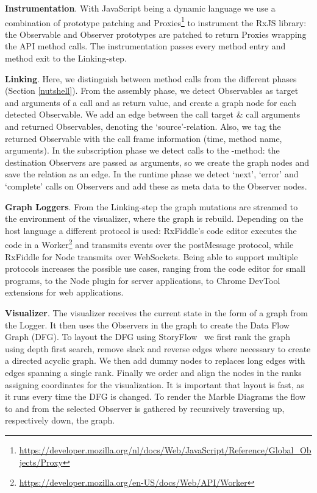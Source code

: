 \textbf{Instrumentation}. With JavaScript being a dynamic language we use a combination of prototype patching and Proxies\footnote{\url{https://developer.mozilla.org/nl/docs/Web/JavaScript/Reference/Global_Objects/Proxy}} to instrument the RxJS library: the Observable and Observer prototypes are patched to return Proxies wrapping the API method calls. The instrumentation passes every method entry and method exit to the Linking-step.

\textbf{Linking}. Here, we distinguish between method calls from the different phases (Section \ref{nutshell}). From the assembly phase, we detect Observables as target and arguments of a call and as return value, and create a graph node for each detected Observable. We add an edge between the call target \& call arguments and returned Observables, denoting the `source'-relation. Also, we tag the returned Observable with the call frame information (time, method name, arguments). In the subscription phase we detect calls to the -method: the destination Observers are passed as arguments, so we create the graph nodes and save the relation as an edge. In the runtime phase we detect `next', `error' and `complete' calls on Observers and add these as meta data to the Observer nodes.

\textbf{Graph Loggers}. From the Linking-step the graph mutations are streamed to the environment of the visualizer, where the graph is rebuild. Depending on the host language a different protocol is used: RxFiddle's code editor executes the code in a Worker\footnote{\url{https://developer.mozilla.org/en-US/docs/Web/API/Worker}} and transmits events over the postMessage protocol, while RxFiddle for Node transmits over WebSockets. Being able to support multiple protocols increases the possible use cases, ranging from the code editor for small programs, to the Node plugin for server applications, to Chrome DevTool extensions for web applications.

\textbf{Visualizer}. The visualizer receives the current state in the form of a graph from the Logger. It then uses the Observers in the graph to create the Data Flow Graph (DFG). 
To layout the DFG using StoryFlow~\cite{liu2013storyflow} we first rank the graph using depth first search, remove slack and reverse edges where necessary to create a directed acyclic graph. We then add dummy nodes to replaces long edges with edges spanning a single rank. Finally we order and align the nodes in the ranks assigning coordinates for the visualization. It is important that layout is fast, as it runs every time the DFG is changed. To render the Marble Diagrams the flow to and from the selected Observer is gathered by recursively traversing up, respectively down, the graph.


